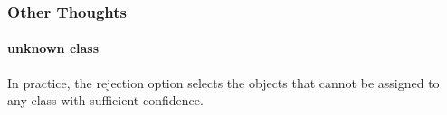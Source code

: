 \subsubsection{Other Thoughts}

\paragraph{unknown class}

In practice, the rejection option selects the objects that cannot be assigned to any class with sufficient confidence.

